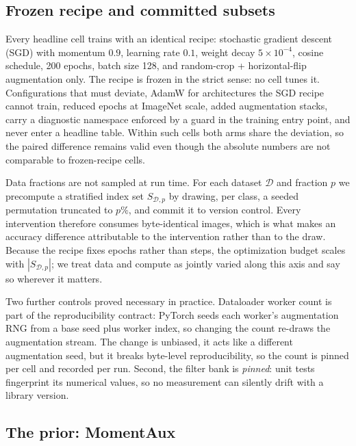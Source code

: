 \subsection{Frozen recipe and committed subsets}\label{sec:recipe}
Every headline cell trains with an identical recipe: stochastic gradient descent (SGD) with momentum
$0.9$, learning rate $0.1$, weight decay $5{\times}10^{-4}$, cosine
schedule, 200 epochs, batch size 128, and random-crop + horizontal-flip
augmentation only. The recipe is frozen in the strict sense: no cell
tunes it. Configurations that must deviate, AdamW \citep{loshchilov2019adamw} for architectures the
SGD recipe cannot train, reduced epochs at ImageNet scale, added
augmentation stacks, carry a diagnostic namespace enforced by a guard
in the training entry point, and never enter a headline table. Within
such cells both arms share the deviation, so the paired difference
remains valid even though the absolute numbers are not comparable to
frozen-recipe cells.

Data fractions are not sampled at run time. For each dataset $\mathcal{D}$
and fraction $p$ we precompute a stratified index set
$S_{\mathcal{D},p}$ by drawing, per class, a seeded permutation truncated
to $p\%$, and commit it to version control. Every intervention therefore
consumes byte-identical images, which is what makes an accuracy
difference attributable to the intervention rather than to the draw.
Because the recipe fixes epochs rather than steps, the optimization
budget scales with $|S_{\mathcal{D},p}|$; we treat data and compute as
jointly varied along this axis and say so wherever it matters.

Two further controls proved necessary in practice. Dataloader worker
count is part of the reproducibility contract: PyTorch seeds each
worker's augmentation RNG from a base seed plus worker index, so changing
the count re-draws the augmentation stream. The change is unbiased, it
acts like a different augmentation seed, but it breaks byte-level
reproducibility, so the count is pinned per cell and recorded per run.
Second, the filter bank is \emph{pinned}: unit tests fingerprint its
numerical values, so no measurement can silently drift with a library
version.

\subsection{The prior: MomentAux}\label{sec:momentaux}
